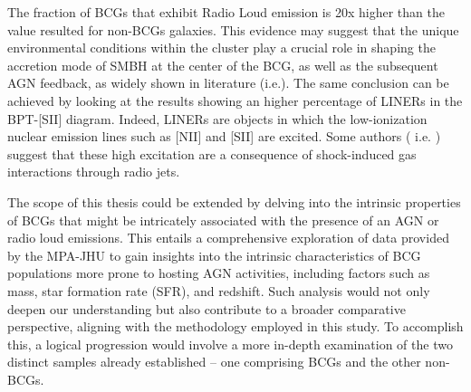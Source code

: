 The fraction of BCGs that exhibit Radio Loud emission is 20x higher than the value resulted for non-BCGs galaxies.
This evidence may suggest that the unique environmental conditions within the cluster play a crucial role in shaping the accretion mode of SMBH at the center of the BCG, as well as the subsequent AGN feedback, as widely shown in literature (i.e.\cite{2019ApJ...883..193N, 2021A&A...649A..23C}).
The same conclusion can be achieved by looking at the results showing an higher percentage of LINERs in the BPT-[SII] diagram. Indeed, LINERs are objects in which the low-ionization nuclear emission lines such as [NII] and [SII] are excited. Some authors ( i.e. \cite{Fabbiano_2022}) suggest that these high excitation are a consequence of shock-induced gas interactions through radio jets.

The scope of this thesis could be extended by delving into the intrinsic properties of BCGs that might be intricately associated with the presence of an AGN or radio loud emissions. This entails a comprehensive exploration of data provided by the MPA-JHU to gain insights into the intrinsic characteristics of BCG populations more prone to hosting AGN activities, including factors such as mass, star formation rate (SFR), and redshift. Such analysis would not only deepen our understanding but also contribute to a broader comparative perspective, aligning with the methodology employed in this study. To accomplish this, a logical progression would involve a more in-depth examination of the two distinct samples already established – one comprising BCGs and the other non-BCGs.

\begin{comment}
Lascio a te scrivere per bene la parte di prospettive future su questa linea di ricerca. Io qui ti faccio un discorsetto in italiano, tu riportalo per bene a modo tuo.
Ora abbiamo visto se le BCG hanno una significativa differenza in frazione di AGN rispetto alle non BCG giusto? E al momento quello che possiamo fare è semplicemente ipotizzare che queste differenze siano guidate dai differenti processi evolutivi delle BCG, a loro volta come conseguenza del fatto che queste si trovano alcentro di overdensity, in cui gas accretion dal cosmic web e merger activity sono all’ordine del giorno. 

Tuttavia sarebbe interessante capire se ci sono proprietà specifiche di queste BCG, che sono correlate con la presenza di un AGN o di un’emissione radio.  Per fare ciò abbiamo altre proprietà derivate dal team XX (gli stessi che ti danno i redshifts e le emissioni in riga), che possono essere utilizzate per avere una view del tipo di proprietà che ha la popolazione più incline ad avere un attività di AGN (Massa, SFR, Z, sigma della riga). Quindi in futuro sarà importante investigare eventuali correlazioni, come già è stato fatto in altri lavori (cercateli), però in questo caso andiamo a studiare le correlazioni in funzione della selezione che abbiamo di BCG e non-BCG. (ps- questi subsamples sono in sè già una selezione in Massa e Environment, perché ovviamente le BCG saranno le galassie più massicce in regioni dense).
Detto ciò vedi quello che puoi scrivere.
Buona conclusione.
\end{comment}



